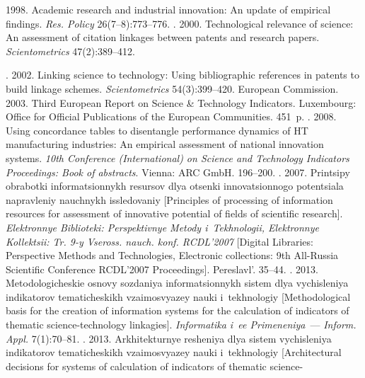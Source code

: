\begin{multicols}{2}
{{\begin{thebibliography}{99}
 1998. Academic research and industrial innovation: An update of empirical 
findings. \textit{Res. Policy} 26(7--8):773--776.
. 2000. Technological relevance of 
science: An assessment of citation linkages between patents and research papers. 
\textit{Scientometrics} 47(2):389--412.

. 2002. 
Linking science to technology: Using bibliographic references in patents to build linkage schemes. 
\textit{Scientometrics} 54(3):399--420.
European Commission. 2003. Third European Report on Science \& Technology Indicators. 
Luxembourg: Office for Official Publications of the European Communities. 451~p.
. 2008. Using concordance tables to 
disentangle performance dynamics of HT manufacturing industries: An empirical assessment of 
national innovation systems. \textit{10th Conference (International) on Science and Technology 
Indicators Proceedings: Book of abstracts}. Vienna: ARC GmbH. 196--200.
. 2007. Printsipy obrabotki informatsionnykh resursov 
dlya otsenki in\-no\-va\-tsi\-on\-no\-go potentsiala napravleniy nauchnykh issledovaniy [Principles of 
processing of information resources for assessment of innovative potential of fields of scientific 
research]. \textit{Elektronnye Biblioteki: Perspektivnye Metody i~Tekhnologii, Elektronnye Kollektsii: 
Tr. 9-y Vseross. nauch. konf. RCDL'2007} [Digital Libraries: Perspective Methods and Technologies, 
Electronic collections: 9th All-Russia Scientific Conference RCDL'2007 Proceedings]. Pereslavl'.  
35--44.
. 2013. 
Metodologicheskie osnovy so\-zda\-niya informatsionnykh sistem dlya vychisleniya indikatorov 
tematicheskikh vzaimosvyazey nauki i~tekhnologiy [Methodological basis for the creation of 
information systems for the calculation of indicators of thematic science-technology linkagies]. 
\textit{Informatika i~ee Primeneniya}~--- \textit{Inform. Appl.} 7(1):70--81.
. 2013. 
Arkhitekturnye resheniya dlya sis\-tem vychisleniya indikatorov tematicheskikh 
vza\-imo\-svya\-zey nauki 
i~tekh\-no\-lo\-giy [Architectural decisions for systems of calculation of indicators of thematic science-

\end{thebibliography}}}
\end{multicols}
